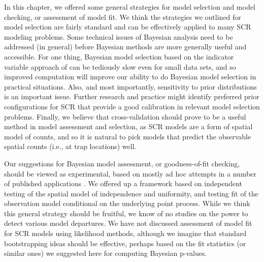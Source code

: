 In this chapter, we offered some general strategies for model
selection and model checking, or assessment of model fit.  We think
the strategies we outlined for model selection are fairly standard
and can be effectively applied to many SCR modeling problems.
Some technical issues of Bayesian analysis need to be addressed (in
general) before Bayesian methods are more generally useful and
accessible.  For one thing, Bayesian model selection based on the
indicator variable approach of \citet{kuo_mallick:1998} can be
tediously slow even for small data sets, and so improved computation
will improve our ability to do Bayesian model selection in practical
situations.  Also, and most importantly, sensitivity to prior
distributions is an important issue. Further research and practice
might identify preferred prior configurations for SCR that provide a
good calibration in relevant model selection problems.
Finally, we believe that 
cross-validation should prove to be a useful method in model
assessment and selection, 
as SCR models are a form of spatial model of counts, and so it is
natural to pick models that predict the observable spatial counts
(i.e., at trap locations) well.

Our suggestions for Bayesian model assessment, or goodness-of-fit
checking, should be viewed as experimental, based on mostly ad hoc
attempts in a number of published applications
\citep[e.g.,]{royle_etal:2009ecol,  royle_etal:2011mee,
gopalaswamy_etal:2012ecol, russell_etal:2012}. We offered up
a framework based on independent testing of the spatial model of
independence and uniformity, and testing fit of the observation model
conditional on the underlying point process.  While we think this
general strategy should be fruitful, we know of no studies on the
 power to detect various model departures. We have not discussed 
assessment of model fit for SCR models using likelihood methods, 
although we imagine that standard bootstrapping ideas should be 
effective, perhaps based on the fit statistics (or similar ones) we 
suggested here for computing Bayesian p-values.

